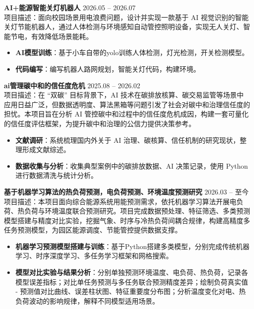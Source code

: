 \documentclass[11pt]{article}
\newlength{\intraProjectTitleSep}
\newcommand{\titlebreak}{\\[\intraProjectTitleSep]}
\newlength{\intraProjectListTopSep}
\begin{document}
\textbf{AI+能源智能关灯机器人} \hfill 2026.05 -- 2026.07 \titlebreak
项目描述：面向校园场景用电浪费问题，设计并实现一款基于 AI 视觉识别的智能关灯节能机器人，通过人体检测与环境感知自动管控照明设备，实现无人关灯、智能节电，有效降低场景能耗。
\begin{itemize}[nosep, topsep=\intraProjectListTopSep]
    \item \textbf{AI模型训练}：基于小车自带的yolo训练人体检测，灯光检测，开关检测模型。
    \item \textbf{代码编写}：编写机器人路网规划，智能关灯代码，构建环境。
\end{itemize}
\bigskip
\bigskip
\textbf{ai管理碳中和的信任度危机} \hfill 2025.08 -- 2026.02 \titlebreak
项目描述：在 “双碳” 目标背景下，AI 技术在碳排放核算、碳交易监管等场景中应用日益广泛，但数据透明度、算法黑箱等问题引发了社会对碳中和治理信任度的担忧。本项目旨在分析 AI 管控碳中和过程中的信任度危机成因，构建一套可量化的信任度评估框架，为提升碳中和治理的公信力提供决策参考。
\begin{itemize}[nosep, topsep=\intraProjectListTopSep]
    \item \textbf{文献调研}：系统梳理国内外关于 AI 治理、碳核算、信任机制的研究现状，整理形成文献综述。
    \item \textbf{数据收集与分析}：收集典型案例中的碳排放数据、AI 决策记录，使用 Python 进行数据清洗与统计分析。
\end{itemize}
\bigskip
\textbf{基于机器学习算法的热负荷预测，电负荷预测、环境温度预测研究} \hfill 2026.03 -- 至今 \titlebreak
项目描述：本项目面向综合能源系统用能预测需求，依托机器学习算法开展电负荷、热负荷与环境温度联合预测研究。项目完成数据预处理、特征筛选、多类预测模型搭建与精度对比实验，挖掘气象、时序与冷热负荷间耦合规律，构建高精度多任务预测模型，为园区能源调度、节能管控提供数据支撑。
\begin{itemize}[nosep, topsep=\intraProjectListTopSep]
    \item \textbf{机器学习预测模型搭建与训练}：基于Python搭建多类模型，分别完成传统机器学习、时序深度学习、多任务学习框架和网格搜索。
    \item \textbf{模型对比实验与结果分析}：分别单独预测环境温度、电负荷、热负荷，记录各模型误差指标；对比单任务预测与多任务联合预测精度差异；绘制负荷真实值 - 预测值对比曲线、误差柱状图、特征重要度分布图；分析温度变化对电、热负荷波动的影响规律，解释不同模型适用场景。
\end{itemize}
\end{document}
